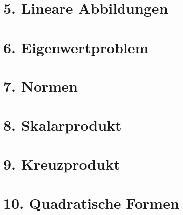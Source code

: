 \begin{multicols*}{4}
\section{5. Lineare Abbildungen}
\WhiteSpace
	
	
	
	
\section{6. Eigenwertproblem}
\WhiteSpace
	
	
	
	
	
	
	

\section{7. Normen}
\WhiteSpace
	
	
	
	
	
\section{8. Skalarprodukt}
\WhiteSpace
	
	
	
	
	
\section{9. Kreuzprodukt}
\WhiteSpace
	
	
	
	
\section{10. Quadratische Formen}
\WhiteSpace
	
	
	
	
	
	
	
	
	

\end{multicols*}
